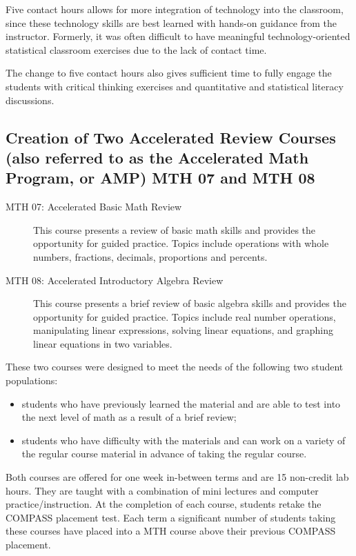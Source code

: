  
Five contact hours allows for more integration of technology into the classroom,
since these technology skills are best learned with hands-on guidance from 
the instructor. Formerly, it
was often difficult to have meaningful technology-oriented statistical classroom
exercises due to the lack of contact time.
 
The change to five contact hours also gives sufficient time to fully engage the
students with critical thinking exercises and quantitative and statistical
literacy discussions.

\subsection[Creation of AMP/MTH008]{Creation of Two Accelerated Review Courses
(also referred to as the Accelerated Math Program, or AMP) MTH 07 and MTH 08}
\label{other:sec:amp} 
\begin{description}
\item[MTH 07: Accelerated Basic Math Review]  This course presents a review of
  basic math skills and provides the opportunity for guided practice.  Topics
  include operations with whole numbers, fractions, decimals, proportions and
  percents.

\item[MTH 08: Accelerated Introductory Algebra Review] This course presents a
  brief review of basic algebra skills and provides the opportunity for guided
  practice.  Topics include real number operations, manipulating linear
  expressions, solving linear equations, and graphing linear equations in two
  variables.
\end{description}

These two courses were designed to meet the needs of the following two student
populations:
\begin{itemize}
\item students who have previously learned the material and are able to test
  into the next level of math as a result of a brief review;
\item students who have difficulty with the materials and can work on a variety
  of the regular course material in advance of taking the regular course.
\end{itemize}

Both courses are offered for one week in-between terms and are 15 non-credit lab
hours.  They are taught with a combination of mini lectures and computer
practice/instruction.  At the completion of each course, students retake the
COMPASS placement test.  Each term a significant number of students taking these
courses have placed into a MTH course above their previous COMPASS placement.

